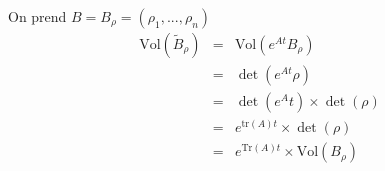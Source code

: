 \bigskip
{}

\begin{dem}
	On prend $B=B_{\rho}=(\rho_1,...,\rho_n)$
	\begin{eqnarray*}
		\text{Vol}(\tilde{B}_{\rho})&=&\text{Vol}(e^{At}B_{\rho})\\
					&=&\det(e^{At}\rho)\\
					&=&\det(e^At)\times\det(\rho)\\
					&=&e^{\text{tr}(A)t}\times\det(\rho)\\
					&=&e^{\text{Tr}(A)t}\times \text{Vol}(B_{\rho})
	\end{eqnarray*}
\end{dem}

